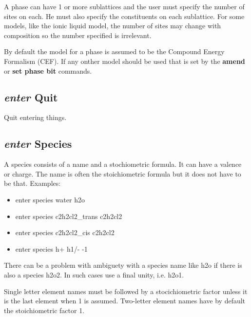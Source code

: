 \documentclass[12pt]{article}
\begin{document}
A phase can have 1 or more sublattices and the user must specify the
number of sites on each.  He must also specify the constituents on
each sublattice.  For some models, like the ionic liquid model, the
number of sites may change with composition so the number specified is
irrelevant.

By default the model for a phase is assumed to be the Compound Energy
Formalism (CEF).  If any onther model should be used that is set by
the {\bf amend} or {\bf set phase bit} commands.

\subsection{{\em enter} Quit}

Quit entering things.

\subsection{{\em enter} Species}

A species consists of a name and a stochiometric formula.  It can have
a valence or charge.  The name is often the stoichiometric formula
but it does not have to be that.  Examples:

\begin{itemize}
\item enter species water h2o
\item enter species c2h2cl2\_trans c2h2cl2
\item enter species c2h2cl2\_cis c2h2cl2
\item enter species h+ h1/- -1
\end{itemize}

There can be a problem with ambiguety with a species name like h2o if
there is also a species h2o2.  In such cases use a final unity, i.e.
h2o1.

Single letter element names must be followed by a stocichiometric
factor unless it is the last element when 1 is assumed.  Two-letter
element names have by default the stoichiometric factor 1.
\end{document}

